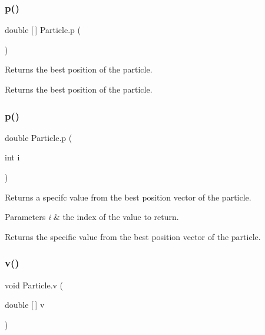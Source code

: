 \subsubsection{\texorpdfstring{p()}{p()}\hspace{0.1cm}{\footnotesize\ttfamily [2/3]}}
{\footnotesize\ttfamily double \mbox{[}$\,$\mbox{]} Particle.\+p (\begin{DoxyParamCaption}{ }\end{DoxyParamCaption})}

Returns the best position of the particle. \begin{DoxyReturn}{Returns}
the best position of the particle. 
\end{DoxyReturn}
\mbox{\label{class_particle_a3ffe07f8456b8f145631fe6e9ae01909}} 
\subsubsection{\texorpdfstring{p()}{p()}\hspace{0.1cm}{\footnotesize\ttfamily [3/3]}}
{\footnotesize\ttfamily double Particle.\+p (\begin{DoxyParamCaption}\item[{int}]{i }\end{DoxyParamCaption})}

Returns a specifc value from the best position vector of the particle. 
\begin{DoxyParams}{Parameters}
{\em i} & the index of the value to return. \\
\hline
\end{DoxyParams}
\begin{DoxyReturn}{Returns}
the specific value from the best position vector of the particle. 
\end{DoxyReturn}
\mbox{\label{class_particle_ad8901cfd25505e1bb17464d3d9eb03f1}} 
\subsubsection{\texorpdfstring{v()}{v()}\hspace{0.1cm}{\footnotesize\ttfamily [1/3]}}
{\footnotesize\ttfamily void Particle.\+v (\begin{DoxyParamCaption}\item[{double \mbox{[}$\,$\mbox{]}}]{v }\end{DoxyParamCaption})}

